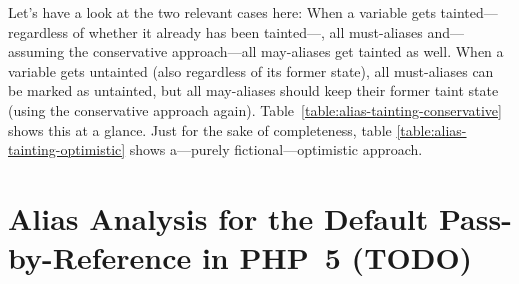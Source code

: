 Let's have a look at the two relevant cases here: When a variable gets tainted---regardless of whether it already has been tainted---, all must-aliases and---assuming the conservative approach---all may-aliases get tainted as well. When a variable gets untainted (also regardless of its former state), all must-aliases can be marked as untainted, but all may-aliases should keep their former taint state (using the conservative approach again). Table~\ref{table:alias-tainting-conservative} shows this at a glance. Just for the sake of completeness, table \ref{table:alias-tainting-optimistic} shows a---purely fictional---optimistic approach.






\section{Alias Analysis for the Default Pass-by-Reference in PHP~5 (TODO)}

